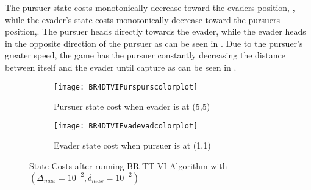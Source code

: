 The pursuer state costs monotonically decrease toward the evaders position, , while the evader's state costs monotonically decrease toward the pursuers position,. The pursuer heads directly towards the evader, while the evader heads in the opposite direction of the pursuer as can be seen in . Due to the pursuer's greater speed, the game has the pursuer constantly decreasing the distance between itself and the evader until capture as can be seen in .
\begin{figure}[h!]
\centering
\begin{subfigure}[t]{0.475\textwidth}
	\centering
	\texttt{[image: BR4DTVIPurspurscolorplot]}
	\caption{Pursuer state cost when evader is at (5,5)}
	\label{BR4DTVIPcp}
\end{subfigure}
\hfill
\begin{subfigure}[t]{0.475\textwidth}
	\centering
	\texttt{[image: BR4DTVIEvadevadcolorplot]}
	\caption{Evader state cost when pursuer is at (1,1)}
	\label{BR4DTVIEcp}
\end{subfigure}
\caption{State Costs after running BR-TT-VI Algorithm with $(\Delta_{max} = 10^{-2},\delta_{max} = 10^{-2})$}
\label{BR4DTVIcp}
\end{figure}
